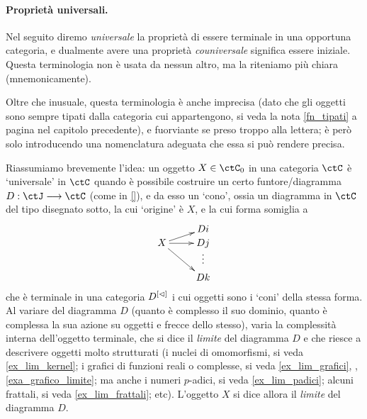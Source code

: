 \paragraph*{Proprietà universali.}
Nel seguito diremo \emph{universale} la proprietà di essere terminale in una opportuna categoria, e dualmente avere una proprietà \emph{couniversale} significa essere iniziale. Questa terminologia non è usata da nessun altro, ma la riteniamo più chiara (mnemonicamente).

Oltre che inusuale, questa terminologia è anche imprecisa (dato che gli oggetti sono sempre tipati dalla categoria cui appartengono, si veda la nota \ref{fn_tipati} a pagina \pageref{fn_tipati} nel capitolo precedente), e fuorviante se preso troppo alla lettera; è però solo introducendo una nomenclatura adeguata che essa si può rendere precisa. 

Riassumiamo brevemente l'idea: un oggetto \(X\in\ctC_0\) in una categoria $\ctC$ è `universale' in \(\ctC\) quando è possibile costruire un certo funtore/diagramma $D : \ctJ \fun \ctC$ (come in \ref{}), e da esso un `cono', ossia un diagramma in $\ctC$ del tipo disegnato sotto, la cui `origine' è \(X\), e la cui forma somiglia a
\begin{equation}\label{cone}\vcenter{\xymatrix@R=0mm{
 & Di \\
 X \ar@{->}[ru] \ar@{->}[r] \ar@{->}[rdd] & Dj \\
 & \vdots \\
 & Dk
 }}
\end{equation}
che è terminale in una categoria ${D}^{[\lhd]}$ i cui oggetti sono i `coni' della stessa forma. Al variare del diagramma \(D\) (quanto è complesso il suo dominio, quanto è complessa la sua azione su oggetti e frecce dello stesso), varia la complessità interna dell'oggetto terminale, che si dice il \emph{limite} del diagramma $D$ e che riesce a descrivere oggetti molto strutturati (i nuclei di omomorfismi, si veda \ref{ex_lim_kernel}; i grafici di funzioni reali o complesse, si veda \ref{ex_lim_grafici}, ,\ref{exa_grafico_limite}; ma anche i numeri \(p\)-adici, si veda \ref{ex_lim_padici}; alcuni frattali, si veda \ref{ex_lim_frattali}; etc). L'oggetto \(X\) si dice allora il \emph{limite} del diagramma \(D\).

